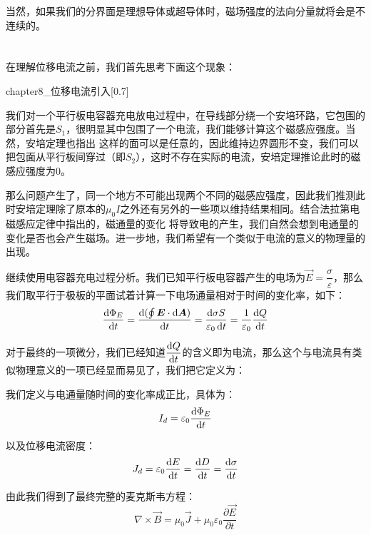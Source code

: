 当然，如果我们的分界面是理想导体或超导体时，磁场强度的法向分量就将会是不连续的。
\section[电磁波]{}
\subsection[位移电流]{}
在理解位移电流之前，我们首先思考下面这个现象：
\begin{singlefigure}[位移电流引入]{chapter8_位移电流引入}[0.7]
\end{singlefigure}

我们对一个平行板电容器充电放电过程中，在导线部分绕一个安培环路，它包围的部分首先是$S_1$，很明显其中包围了一个电流，我们能够计算这个磁感应强度。当然，安培定理也指出
这样的面可以是任意的，因此维持边界圆形不变，我们可以把包面从平行板间穿过（即$S_2$），这时不存在实际的电流，安培定理推论此时的磁感应强度为0。

那么问题产生了，同一个地方不可能出现两个不同的磁感应强度，因此我们推测此时安培定理除了原本的$\mu_0 I$之外还有另外的一些项以维持结果相同。结合法拉第电磁感应定律中指出的，磁通量的变化
将导致电的产生，我们自然会想到电通量的变化是否也会产生磁场。进一步地，我们希望有一个类似于电流的意义的物理量的出现。

继续使用电容器充电过程分析。我们已知平行板电容器产生的电场为$\vec{E} = \dfrac{\sigma}{\varepsilon}$，那么我们取平行于极板的平面试着计算一下电场通量相对于时间的变化率，如下：
\[\dfrac{\dif{\Phi_E}}{\dif{t}} = \dfrac{\dif{(\oint \vec{E}\cdot\dif{\vec{A}})}}{\dif{t}}=\dfrac{\dif{\sigma S}}{\varepsilon_0\dif{t}} = \dfrac{1}{\varepsilon_0}\dfrac{\dif{Q}}{\dif{t}}\]

对于最终的一项微分，我们已经知道$\dfrac{\dif{Q}}{\dif{t}}$的含义即为电流，那么这个与电流具有类似物理意义的一项已经显而易见了，我们把它定义为：
\begin{law}
    我们定义与电通量随时间的变化率成正比，具体为：
    \[I_d = \varepsilon_0\dfrac{\dif{\Phi_E}}{\dif{t}}\]

    以及位移电流密度：
    \[J_d = \varepsilon_0\dfrac{\dif{E}}{\dif{t}}=\dfrac{\dif{D}}{\dif{t}}=\dfrac{\dif{\sigma}}{\dif{t}}\]
\end{law}

由此我们得到了最终完整的麦克斯韦方程：
\[\nabla\times \vec{B} = \mu_0\vec{J}+\mu_0\varepsilon_0\dfrac{\partial{\vec{E}}}{\partial{t}}\]

